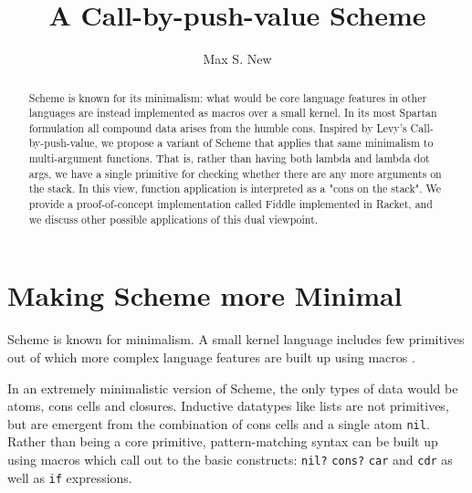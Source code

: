 \documentclass[acmsmall,screen,review,anonymous]{acmart}
\begin{document}
\pagebreak

\title{A Call-by-push-value Scheme}

\author{Max S. New}

\begin{abstract}
Scheme is known for its minimalism: what would be core language features in other languages are instead implemented as macros over a small kernel. In its most Spartan formulation all compound data arises from the humble cons. Inspired by Levy's Call-by-push-value, we propose a variant of Scheme that applies that same minimalism to multi-argument functions. That is, rather than having both lambda and lambda dot args, we have a single primitive for checking whether there are any more arguments on the stack. In this view, function application is interpreted as a "cons on the stack". We provide a proof-of-concept implementation called Fiddle implemented in Racket, and we discuss other possible applications of this dual viewpoint.
\end{abstract}


\maketitle

\section{Making Scheme more Minimal}

Scheme is known for minimalism. A small kernel language includes few
primitives out of which more complex language features are built up
using macros \cite{growing-a-language}.

In an extremely minimalistic version of Scheme, the only types of data
would be atoms, cons cells and closures. Inductive datatypes like
lists are not primitives, but are emergent from the combination of
cons cells and a single atom \texttt{nil}.
%
Rather than being a core primitive, pattern-matching syntax can be
built up using macros which call out to the basic constructs:
\texttt{nil?} \texttt{cons?} \texttt{car} and \texttt{cdr} as well as
\texttt{if} expressions.
\end{document}
